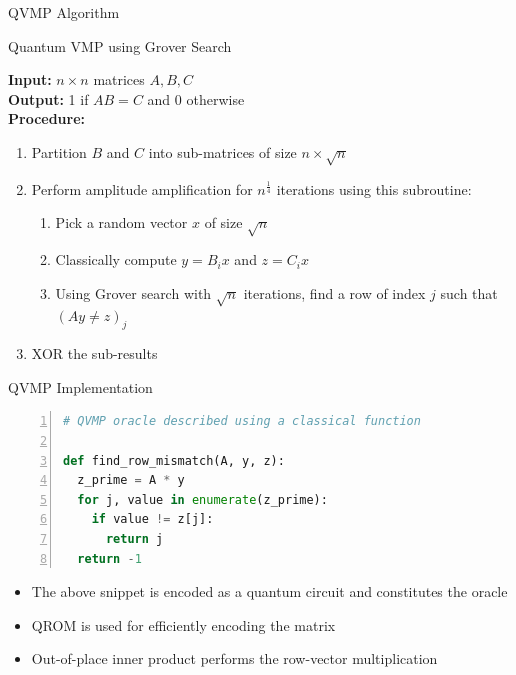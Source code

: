 \documentclass[10pt]{beamer}
\begin{document}
\begin{frame}{QVMP Algorithm}
\begin{algorithm}[H]
  \caption{Quantum VMP using Grover Search}
  \label{alg:qvmp_grover}
  \textbf{Input: } $n \times n$ matrices $A, B, C$ \\
  \textbf{Output: } 1 if $AB = C$ and 0 otherwise \\
  \textbf{Procedure: }
  \begin{enumerate}
    \item Partition $B$ and $C$ into sub-matrices of size $n \times \sqrt{n}$
    \item 
      {
        Perform amplitude amplification for $n^{\frac{1}{4}}$ iterations using this subroutine:
        \begin{enumerate}
          \item Pick a random vector $x$ of size $\sqrt{n}$
          \item Classically compute $y = B_ix$ and $z = C_ix$
          \item Using Grover search with $\sqrt{n}$ iterations, find a row of
            index $j$ such that $(Ay \neq z)_j$
        \end{enumerate}
      }
    \item XOR the sub-results
  \end{enumerate}
\end{algorithm}
\end{frame}

\begin{frame}[fragile]{QVMP Implementation}
  \begin{lstlisting}[frame=single,language=Python, numbers=left]
# QVMP oracle described using a classical function

def find_row_mismatch(A, y, z):
  z_prime = A * y
  for j, value in enumerate(z_prime):
    if value != z[j]:
      return j
  return -1
  \end{lstlisting}

  \begin{itemize}
    \item The above snippet is encoded as a quantum circuit and constitutes
      the oracle
    \item QROM is used for efficiently encoding the matrix
    \item Out-of-place inner product performs the row-vector multiplication
  \end{itemize}
\end{frame}
\end{document}
